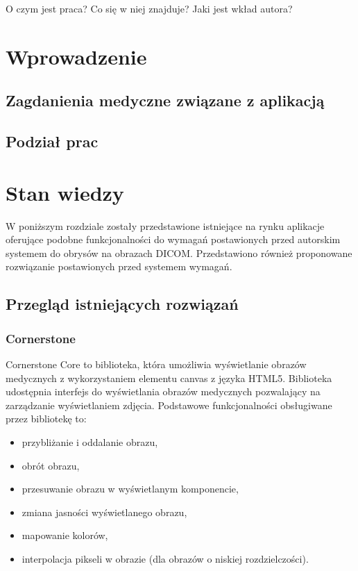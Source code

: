 \documentclass[a4paper,11pt,twoside,openright]{report}
\theoremstyle{definition}
\begin{document}
O czym jest praca? Co się w niej znajduje? Jaki jest wkład autora?

\chapter {Wprowadzenie}

\section {Zagdanienia medyczne związane z aplikacją}

\section {Podział prac}

\chapter {Stan wiedzy}

W poniższym rozdziale zostały przedstawione istniejące na rynku aplikacje oferujące podobne funkcjonalności do wymagań postawionych przed autorskim systemem do obrysów na obrazach DICOM. Przedstawiono również proponowane rozwiązanie postawionych przed systemem wymagań.

\section {Przegląd istniejących rozwiązań}

\subsection {Cornerstone}

Cornerstone Core \cite{Cornerstone Core} to biblioteka, która umożliwia wyświetlanie obrazów medycznych z wykorzystaniem elementu canvas z języka HTML5. Biblioteka udostępnia interfejs do wyświetlania obrazów medycznych pozwalający na zarządzanie wyświetlaniem zdjęcia. Podstawowe funkcjonalności obsługiwane przez bibliotekę to:

\begin{itemize}[noitemsep]
\item przybliżanie i oddalanie obrazu,
\item obrót obrazu,
\item przesuwanie obrazu w wyświetlanym komponencie,
\item zmiana jasności wyświetlanego obrazu,
\item mapowanie kolorów,
\item interpolacja pikseli w obrazie (dla obrazów o niskiej rozdzielczości).
\end{itemize}
\end{document}
